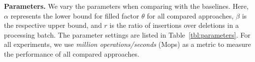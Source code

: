 \vspace{1mm}\noindent\textbf{Parameters.}
We vary the parameters when comparing \voter with the baselines.
Here, $\alpha$ represents the lower bound for filled factor $\theta$ for all compared approaches, $\beta$ is the respective upper bound, and $r$ is the ratio of insertions over deletions in a processing batch. 
The parameter settings are listed in Table~\ref{tbl:parameters}. For all experiments, we use \emph{million operations/seconds} (Mops) as a metric to measure the performance of all compared approaches.



